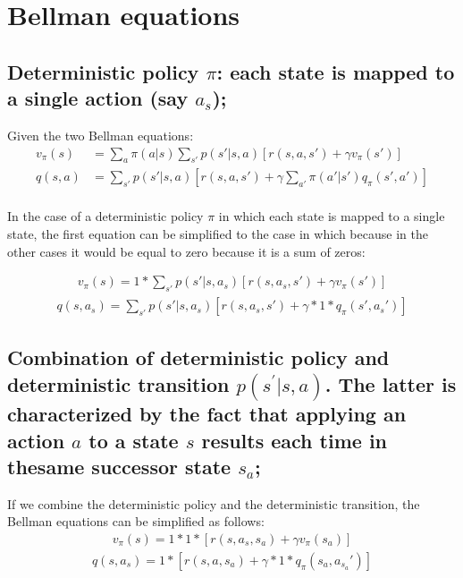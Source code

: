 \section{Bellman equations}

\subsection{Deterministic policy $\pi$: each state is mapped to a single action (say $a_s$);}
Given the two Bellman equations:
\begin{align*}
    v_\pi(s)&=\sum\limits_{a}\pi(a|s)\sum\limits_{s'}p(s'|s,a)\left[r(s,a,s')+\gamma v_\pi(s')\right]\\
    q(s, a)&=\sum\limits_{s'}p(s'|s,a)\left[r(s, a, s')+\gamma\sum\limits_{a'}\pi(a'|s')q_\pi(s',a')\right]\\
\end{align*}


In the case of a deterministic policy $\pi$ in which each state is mapped to a single state, the first equation can be
simplified to the case in which  because in the other cases it would be equal to zero because it
is a sum of zeros:

\begin{align*}
    v_\pi(s)=1*\sum\limits_{s'}p(s'|s,a_s)\left[r(s,a_s,s')+\gamma v_\pi(s')\right]
\end{align*}
\begin{align*}
    q(s, a_s)=\sum\limits_{s'}p(s'|s,a_s)\left[r(s, a_s, s')+\gamma * 1 * q_\pi(s',a_{s}')\right]
\end{align*}

\subsection{Combination of deterministic policy and deterministic transition $p(s^{'}|s,a)$. The latter is characterized
by
the fact that applying an action $a$ to a state $s$ results each time in thesame successor state $s_a$;}
If we combine the deterministic policy and the deterministic transition, the Bellman equations can be simplified as follows:
\begin{align*}
    v_\pi(s)=1*1*\left[r(s,a_s,s_a)+\gamma v_\pi(s_a)\right]
\end{align*}
\begin{align*}
    q(s, a_s)=1*\left[r(s, a, s_a)+\gamma * 1 * q_\pi(s_a,a_{s_a}')\right]
\end{align*}